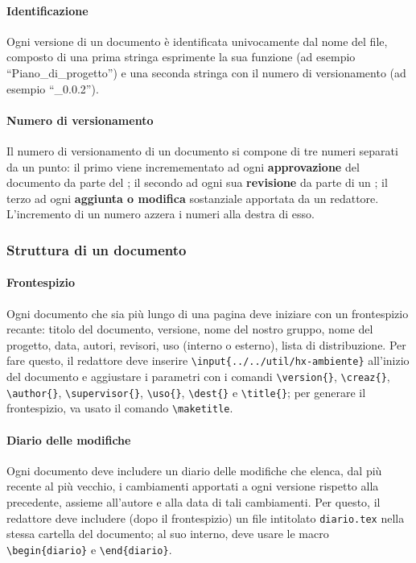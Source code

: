 \begin{itemize}
\paragraph{Identificazione} Ogni versione di un documento è identificata univocamente dal nome del file, composto di una prima stringa esprimente la sua funzione (ad esempio “Piano\_di\_progetto”) e una seconda stringa con il numero di versionamento (ad esempio “\_0.0.2”).
\paragraph{Numero di versionamento} Il numero di versionamento di un documento si compone di tre numeri separati da un punto: il primo viene incremementato ad ogni \textbf{approvazione} del documento da parte del ; il secondo ad ogni sua \textbf{revisione} da parte di un ; il terzo ad ogni \textbf{aggiunta o modifica} sostanziale apportata da un redattore. L'incremento di un numero azzera i numeri alla destra di esso.

\subsubsection{Struttura di un documento}
\paragraph{Frontespizio} Ogni documento che sia più lungo di una pagina deve iniziare con un frontespizio recante: titolo del documento, versione, nome del nostro gruppo, nome del progetto, data, autori, revisori, uso (interno o esterno), lista di distribuzione. Per fare questo, il redattore deve inserire \texttt{\textbackslash input\{../../util/hx-ambiente\}} all'inizio del documento e aggiustare i parametri con i comandi \texttt{\textbackslash version\{\}}, \texttt{\textbackslash creaz\{\}}, \texttt{\textbackslash author\{\}}, \texttt{\textbackslash supervisor\{\}}, \texttt{\textbackslash uso\{\}}, \texttt{\textbackslash dest\{\}} e \texttt{\textbackslash title\{\}}; per generare il frontespizio, va usato il comando \texttt{\textbackslash maketitle}.
\paragraph{Diario delle modifiche} Ogni documento deve includere un diario delle modifiche che elenca, dal più recente al più vecchio, i cambiamenti apportati a ogni versione rispetto alla precedente, assieme all'autore e alla data di tali cambiamenti. Per questo, il redattore deve includere (dopo il frontespizio) un file intitolato \texttt{diario.tex} nella stessa cartella del documento; al suo interno, deve usare le macro \texttt{\textbackslash begin\{diario\}} e \texttt{\textbackslash end\{diario\}}.

\end{itemize}
